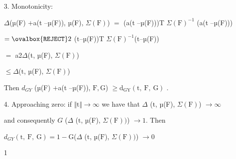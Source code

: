 \documentclass[a4paper,12pt]{article}
\begin{document}
3. Monotonicity:

$\Delta$(µ(F) $+$a(t --µ(F)), µ(F), $\Sigma(\mathrm{F})$) $=$ (a(t --µ(F)))T $\Sigma(\mathrm{F})^{-1}$ (a(t --µ(F)))

$=\ovalbox{\tt\small REJECT} 2$ ($\mathrm{t}$--µ(F))T $\Sigma(\mathrm{F})^{-1}$($\mathrm{t}$--µ(F))

$=$ a2$\Delta$(t, µ(F), $\Sigma(\mathrm{F})$)

$\leq\Delta$($\mathrm{t}$, µ(F), $\Sigma(\mathrm{F})$)

Then $d_{GY}$ (µ(F) $+$a(t --µ(F)), $\mathrm{F}, \mathrm{G}$) $\geq \mathrm{d}_{\mathrm{G}\mathrm{Y}}(\mathrm{t},\ \mathrm{F},\ \mathrm{G})$ .

4. Approaching zero: if $\Vert \mathrm{t} \Vert\rightarrow \infty$ we have that $\Delta$ ($\mathrm{t}$, µ(F), $\Sigma(\mathrm{F})$) $\rightarrow \infty$

and consequently $G$ ($\Delta$ ($\mathrm{t}$, µ(F), $\Sigma(\mathrm{F}))$) $\rightarrow 1$. Then
\begin{center}
$d_{GY}(\mathrm{t},\ \mathrm{F},\ \mathrm{G})=1-\mathrm{G}$($\Delta$ ($\mathrm{t}$, µ($\mathrm{F}$), $\Sigma(\mathrm{F}))$) $\rightarrow 0$
\end{center}
1
\end{document}
